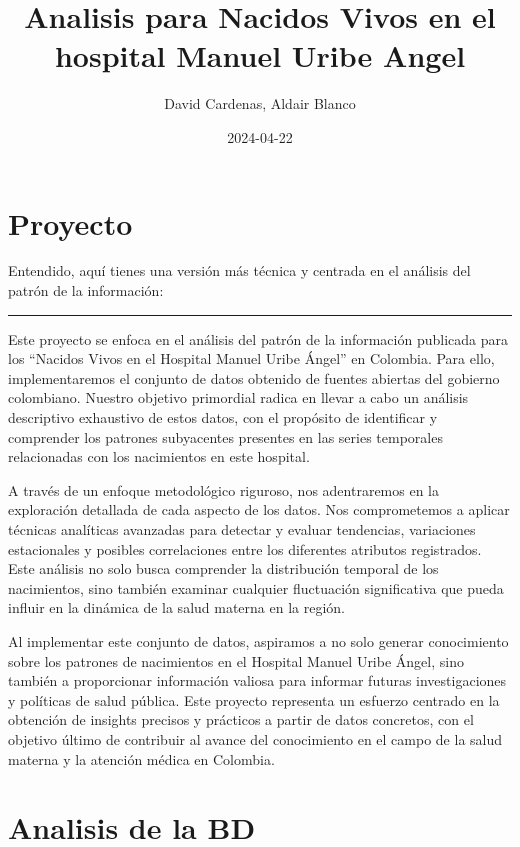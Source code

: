 \documentclass[
]{book}
\title{Analisis para Nacidos Vivos en el hospital Manuel Uribe Angel}
\author{David Cardenas, Aldair Blanco}
\date{2024-04-22}
\begin{document}
\maketitle

{
\setcounter{tocdepth}{1}
\tableofcontents
}
\chapter{Proyecto}\label{proyecto}

Entendido, aquí tienes una versión más técnica y centrada en el análisis del patrón de la información:

\begin{center}\rule{0.5\linewidth}{0.5pt}\end{center}

Este proyecto se enfoca en el análisis del patrón de la información publicada para los ``Nacidos Vivos en el Hospital Manuel Uribe Ángel'' en Colombia. Para ello, implementaremos el conjunto de datos obtenido de fuentes abiertas del gobierno colombiano. Nuestro objetivo primordial radica en llevar a cabo un análisis descriptivo exhaustivo de estos datos, con el propósito de identificar y comprender los patrones subyacentes presentes en las series temporales relacionadas con los nacimientos en este hospital.

A través de un enfoque metodológico riguroso, nos adentraremos en la exploración detallada de cada aspecto de los datos. Nos comprometemos a aplicar técnicas analíticas avanzadas para detectar y evaluar tendencias, variaciones estacionales y posibles correlaciones entre los diferentes atributos registrados. Este análisis no solo busca comprender la distribución temporal de los nacimientos, sino también examinar cualquier fluctuación significativa que pueda influir en la dinámica de la salud materna en la región.

Al implementar este conjunto de datos, aspiramos a no solo generar conocimiento sobre los patrones de nacimientos en el Hospital Manuel Uribe Ángel, sino también a proporcionar información valiosa para informar futuras investigaciones y políticas de salud pública. Este proyecto representa un esfuerzo centrado en la obtención de insights precisos y prácticos a partir de datos concretos, con el objetivo último de contribuir al avance del conocimiento en el campo de la salud materna y la atención médica en Colombia.

\chapter{Analisis de la BD}\label{intro}
\end{document}
